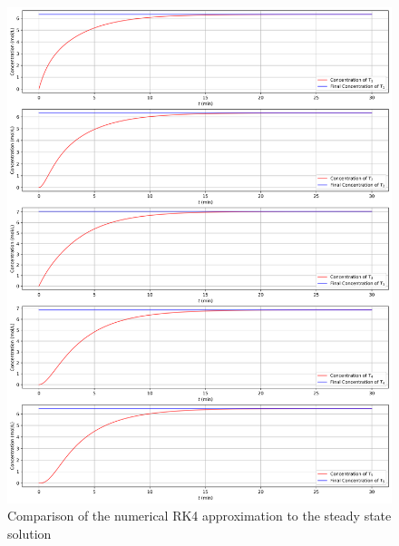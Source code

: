 \documentclass[a4paper, 12pt]{article}
\begin{document}
\begin{figure}[H]
\centering
\includegraphics[width=.9\textwidth]{NumericalVsSteadyState.png}
\caption{Comparison of the numerical RK4 approximation to the steady state solution}
\label{fig:num-vs-steady}
\end{figure}
\end{document}
